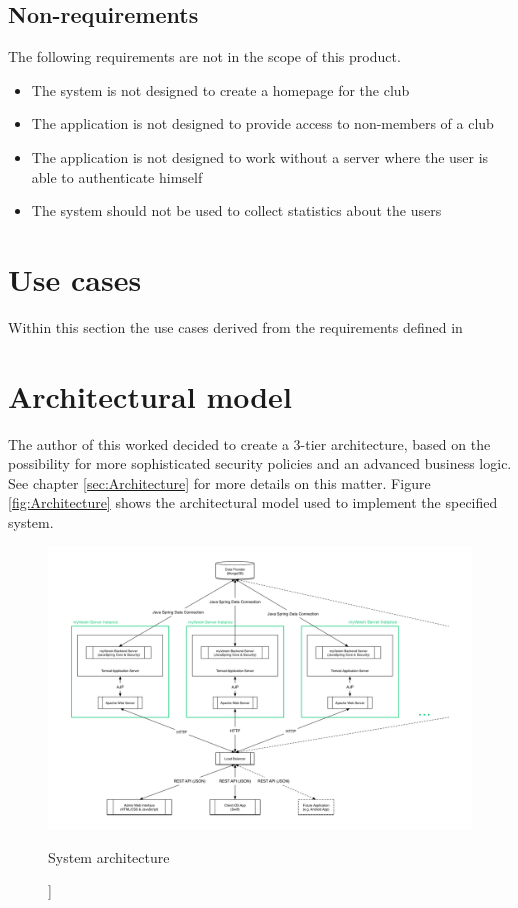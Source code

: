 \subsection{Non-requirements} %
The following requirements are not in the scope of this product.
\begin{itemize}
\item The system is not designed to create a homepage for the club
\item The application is not designed to provide access to non-members of a club
\item The application is not designed to work without a server where the user is able to authenticate himself
\item The system should not be used to collect statistics about the users
\end{itemize}

\section{Use cases}
Within this section the  use cases derived from the requirements defined in 










\section{Architectural model}
The author of this worked decided to create a 3-tier architecture, based on the possibility for more sophisticated security policies and an advanced business logic. See chapter \vref{sec:Architecture} for more details on this matter. Figure \vref{fig:Architecture} shows the architectural model used to implement the specified system.

\begin{figure}[h]
  	\centering
  	\includegraphics[width=0.95\linewidth]{./images/architecture.png}
  	\caption[System architecture [own figure]]{System architecture}
	\label{fig:Architecture}
\end{figure}

